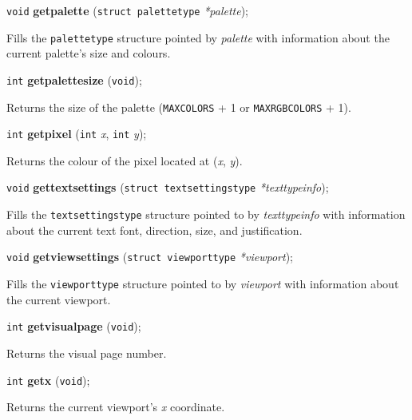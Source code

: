 \documentclass[a4paper,11pt]{article}
\newcommand{\V}{\texttt{void}}      %
\newcommand{\I}{\texttt{int}}       %
\newcommand{\func}[1]{\textbf{#1}}  %
\newcommand{\A}[1]{\emph{#1}}       %
\newcommand{\T}[1]{\texttt{#1}}     %
\newenvironment{bgi}
{ %
  \begin{snugshade}
}
{ %
  \end{snugshade}
}
\begin{document}
\begin{bgi}
\V{} \func{getpalette} (\texttt{struct palettetype} \A{*palette});
\end{bgi}

Fills the \texttt{palettetype} structure pointed by \A{palette} with
information about the current palette's size and colours.


\begin{bgi}
\I{} \func{getpalettesize} (\V{}); 
\end{bgi}

Returns the size of the palette (\T{MAXCOLORS} + 1 or
\T{MAXRGB\-COLORS} + 1).


\begin{bgi}
\I{} \func{getpixel} (\I{} \A{x}, \I{} \A{y});
\end{bgi}

Returns the colour of the pixel located at (\A{x}, \A{y}).


\begin{bgi}
\V{} \func{gettextsettings} (\texttt{struct textsettingstype}
\A{*texttypeinfo});
\end{bgi}

Fills the \texttt{textsettingstype} structure pointed to by
\A{texttypeinfo} with information about the current text font,
direction, size, and justification.


\begin{bgi}
\V{} \func{getviewsettings} (\texttt{struct viewporttype} \A{*viewport});
\end{bgi}

Fills the \texttt{viewporttype} structure pointed to by \A{viewport}
with information about the current viewport.


\begin{bgi}
\I{} \func{getvisualpage} (\V{});
\end{bgi}

Returns the visual page number.


\begin{bgi}
\I{} \func{getx} (\V{});
\end{bgi}

Returns the current viewport's \A{x} coordinate.

\end{document}

